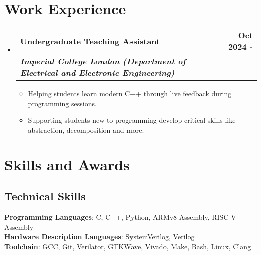 \documentclass[a4paper,11pt]{article}
\makeatletter
\newcommand{\resumeItem}[1]{
  \item\small{
    {#1 \vspace{-2pt}}
  }
}
\newcommand{\resumeSubheading}[4]{
  \vspace{-2pt}\item
    \begin{tabular*}{1.0\textwidth}[t]{l@{\extracolsep{\fill}}r}
      \textbf{#1} & \textbf{\small #2} \\
      \textbf{\textit{\small #3}} & \textit{\small #4} \\
    \end{tabular*}\vspace{-7pt}
}
\newcommand{\resumeSubHeadingWorkListStart}{\begin{itemize}[leftmargin=0.0in, label={}]}
\newcommand{\resumeSubHeadingWorkListEnd}{\end{itemize}}
\newcommand{\resumeItemListStart}{\begin{itemize}}
\newcommand{\resumeItemListEnd}{\end{itemize}\vspace{-5pt}}
\makeatother
\begin{document}
\section{Work Experience}
\resumeSubHeadingWorkListStart
\resumeSubheading
{Undergraduate Teaching Assistant}{Oct 2024 -}
{Imperial College London (Department of Electrical and Electronic Engineering)}{}
\resumeItemListStart
\resumeItem{Helping students learn modern C++ through live feedback during programming sessions.}
\resumeItem{Supporting students new to programming develop critical skills like abstraction, decomposition and more.}
\resumeItemListEnd
\resumeSubHeadingWorkListEnd


\section{Skills and Awards}

\subsection*{\normalsize Technical Skills}
\begin{itemize}[leftmargin=0.15in, label={}]
    \small{\item{
    \textbf{Programming Languages}{: C, C++, Python, ARMv8 Assembly, RISC-V Assembly} \\
    \textbf{Hardware Description Languages}{: SystemVerilog, Verilog} \\
    \textbf{Toolchain}{: GCC, Git, Verilator, GTKWave, Vivado, Make, Bash, Linux, Clang} \\
    }}
\end{itemize}
\end{document}
